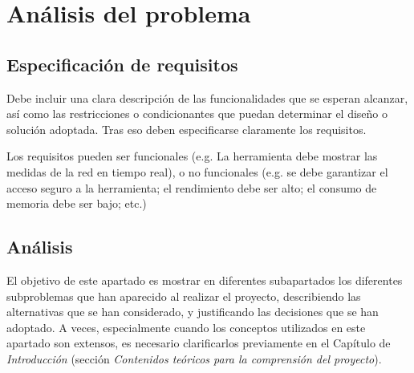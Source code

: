 \chapter{Análisis del problema}


\section{Especificación de requisitos}

Debe incluir una clara descripción de las funcionalidades que se esperan alcanzar, así como las restricciones o condicionantes que puedan determinar el diseño o solución adoptada. Tras eso deben especificarse claramente los requisitos.

Los requisitos pueden ser funcionales (e.g. La herramienta debe mostrar las medidas de la red en tiempo real), o no funcionales (e.g. se debe garantizar el acceso seguro a la herramienta; el rendimiento debe ser alto; el consumo de memoria debe ser bajo; etc.)


\section{Análisis}

El objetivo de este apartado es mostrar en diferentes subapartados los diferentes subproblemas que han aparecido al realizar el proyecto, describiendo las alternativas que se han considerado, y justificando las decisiones que se han adoptado. A veces, especialmente cuando los conceptos utilizados en este apartado son extensos, es necesario clarificarlos previamente en el Capítulo de \textit{Introducción} (sección \textit{Contenidos teóricos para la comprensión del proyecto}).   